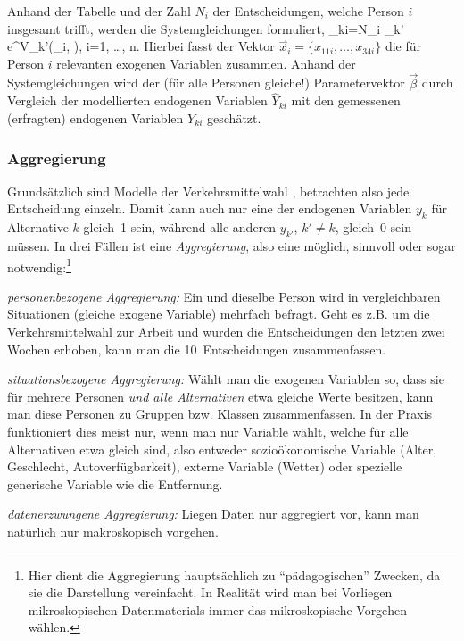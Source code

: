 \noindent
Anhand der Tabelle und der Zahl $N_i$ der Entscheidungen, welche
Person $i$ insgesamt trifft, werden die Systemgleichungen formuliert,
\be
\label{allg-MNL-system}
 _{ki}=N_i 
  {\sum_{k'} e^{V_{k'}(_i, \vec{\beta})}}, \quad i=1, \ldots, n.
\ee
Hierbei fasst der Vektor $\vec{x}_i=\{x_{11i}, \ldots, x_{34i}\}$ die
f\"ur Person $i$ relevanten exogenen Variablen zusammen. Anhand der
Systemgleichungen wird der (f\"ur alle Personen gleiche!) Parametervektor $\vec{\beta}$
durch Vergleich der modellierten endogenen Variablen $\hat{Y}_{ki}$
mit den gemessenen (erfragten) endogenen Variablen $Y_{ki}$
gesch\"atzt.




\subsubsection{Aggregierung}

Grunds\"atzlich sind Modelle der Verkehrsmittelwahl
, betrachten also jede Entscheidung einzeln. Damit
kann auch nur eine der endogenen Variablen $y_k$ f\"ur Alternative $k$
gleich~1 sein, w\"ahrend alle anderen $y_{k'}$, $k'\neq k$, gleich~0
sein m\"ussen. In drei F\"allen ist eine \emph{Aggregierung}, also eine
m\"oglich, sinnvoll oder sogar notwendig:\footnote{Hier dient die
  Aggregierung  haupts\"achlich zu
  ``p\"adagogischen'' Zwecken, da sie die Darstellung vereinfacht. In
  Realit\"at wird man bei Vorliegen mikroskopischen Datenmaterials
  immer das mikroskopische Vorgehen w\"ahlen.}
\bi
\item \emph{personenbezogene Aggregierung:} 
Ein und dieselbe Person wird in vergleichbaren Situationen (gleiche
exogene Variable)
  mehrfach befragt. Geht es z.B. um die Verkehrsmittelwahl zur Arbeit
  und wurden die Entscheidungen
  den letzten zwei Wochen erhoben, kann man die 10~Entscheidungen zusammenfassen.
\item \emph{situationsbezogene Aggregierung:} 
W\"ahlt man die exogenen Variablen so, dass sie
f\"ur mehrere Personen \emph{und alle Alternativen} etwa gleiche Werte
besitzen, kann man diese Personen zu Gruppen bzw. Klassen zusammenfassen. In der
Praxis funktioniert dies meist nur, wenn man nur Variable w\"ahlt, welche
f\"ur alle Alternativen etwa gleich sind, also entweder
sozio\"okonomische Variable (Alter, Geschlecht, Autoverf\"ugbarkeit), externe Variable
(Wetter) oder spezielle generische Variable wie die Entfernung.
\item \emph{datenerzwungene Aggregierung:} Liegen Daten nur aggregiert
  vor, kann man nat\"urlich nur makroskopisch vorgehen.
\ei

